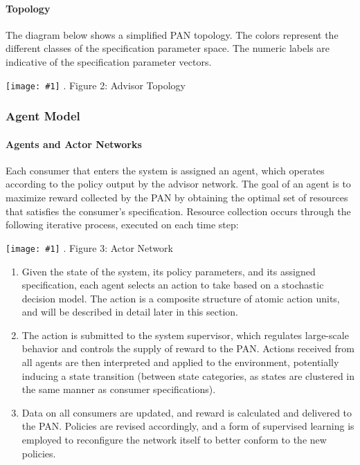 \documentclass{article}
\theoremstyle{definition}
\theoremstyle{remark}
\newcommand{\addpic}[1]{\texttt{[image: \#1]}}
\begin{document}
				\paragraph{Topology}

				The diagram below shows a simplified PAN topology. The colors represent the different classes of the specification parameter space. The numeric labels are indicative of the specification parameter vectors.

				\addpic{figures/advisor_topology.png}
		 		.\hspace{3 cm}  Figure 2:  Advisor Topology	

		\subsubsection{Agent Model}
		
			\paragraph{Agents and Actor Networks}

			Each consumer that enters the system is assigned an agent, which operates according to the policy output by the advisor network. The goal of an agent is to maximize reward collected by the PAN by obtaining the optimal set of resources that satisfies the consumer's specification. Resource collection occurs through the following iterative process, executed on each time step:
			
			\addpic{figures/actor_network}
			.\hspace{3.5cm}  Figure 3:  Actor Network
			
			\begin{enumerate}

				\item Given the state of the system, its policy parameters, and its assigned specification, each agent selects an action to take based on a stochastic decision model. The action is a composite structure of atomic action units, and will be described in detail later in this section.

				\item The action is submitted to the system supervisor, which regulates large-scale behavior and controls the supply of reward to the PAN. Actions received from all agents are then interpreted and applied to the environment, potentially inducing a state transition (between state categories, as states are clustered in the same manner as consumer specifications).

				\item Data on all consumers are updated, and reward is calculated and delivered to the PAN. Policies are revised accordingly, and a form of supervised learning is employed to reconfigure the network itself to better conform to the new policies.

			\end{enumerate}
\end{document}
